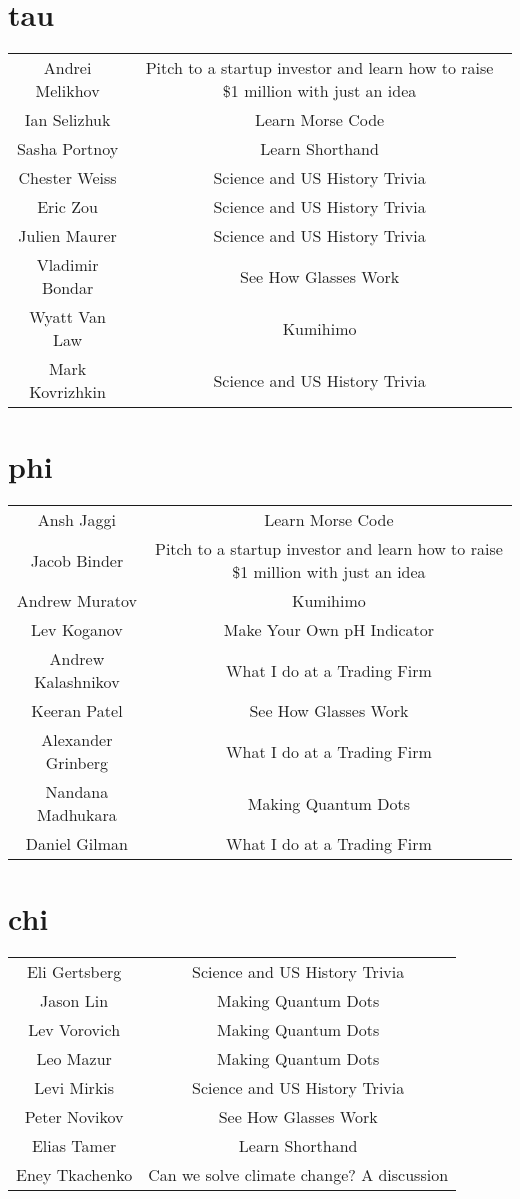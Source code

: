 \documentclass{article}
\begin{document}
\section*{tau}
\setlength{\tabcolsep}{60pt}
\begin{tabular}{c c}
Andrei Melikhov & Pitch to a startup investor and learn how to raise \$1 million with just an idea \\
Ian Selizhuk & Learn Morse Code \\
Sasha Portnoy & Learn Shorthand \\
Chester Weiss & Science and US History Trivia \\
Eric Zou & Science and US History Trivia \\
Julien Maurer & Science and US History Trivia \\
Vladimir Bondar & See How Glasses Work \\
Wyatt Van Law & Kumihimo \\
Mark Kovrizhkin & Science and US History Trivia \\
\end{tabular}
\section*{phi}
\setlength{\tabcolsep}{60pt}
\begin{tabular}{c c}
Ansh Jaggi & Learn Morse Code \\
Jacob Binder & Pitch to a startup investor and learn how to raise \$1 million with just an idea \\
Andrew Muratov & Kumihimo \\
Lev Koganov & Make Your Own pH Indicator \\
Andrew Kalashnikov & What I do at a Trading Firm \\
Keeran Patel & See How Glasses Work \\
Alexander Grinberg & What I do at a Trading Firm \\
Nandana Madhukara & Making Quantum Dots \\
Daniel Gilman & What I do at a Trading Firm \\
\end{tabular}
\section*{chi}
\setlength{\tabcolsep}{60pt}
\begin{tabular}{c c}
Eli Gertsberg & Science and US History Trivia \\
Jason Lin & Making Quantum Dots \\
Lev Vorovich & Making Quantum Dots \\
Leo Mazur & Making Quantum Dots \\
Levi Mirkis & Science and US History Trivia \\
Peter Novikov & See How Glasses Work \\
Elias Tamer & Learn Shorthand \\
Eney Tkachenko & Can we solve climate change? A discussion \\
\end{tabular}
\end{document}
